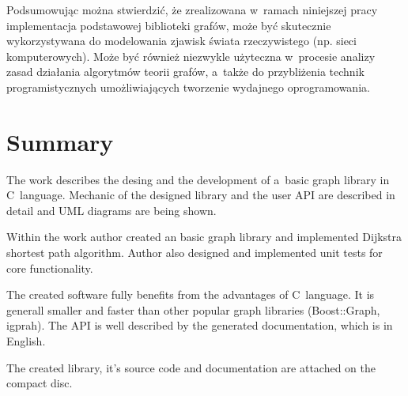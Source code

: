 \documentclass[a4paper,12pt,polish,twoside,openright]{thesis}
\begin{document}
Podsumowując można stwierdzić, że zrealizowana w~ramach niniejszej pracy implementacja podstawowej biblioteki grafów, może być skutecznie wykorzystywana do modelowania zjawisk świata rzeczywistego (np. sieci komputerowych).
Może być również niezwykle użyteczna w~procesie analizy zasad działania algorytmów teorii grafów, a~także do przybliżenia technik programistycznych umożliwiających tworzenie wydajnego oprogramowania.

\chapter*{Summary}
The work describes the desing and the development of a~basic graph library in C~language.
Mechanic of the designed library and the user API are described in detail and UML diagrams are being shown.

Within the work author created an basic graph library and implemented Dijkstra shortest path algorithm.
Author also designed and implemented unit tests for core functionality.

The created software fully benefits from the advantages of C~language.
It is generall smaller and faster than other popular graph libraries (Boost::Graph, igprah).
The API is well described by the generated documentation, which is in English.

The created library, it's source code and documentation are attached on the compact disc.
\end{document}

